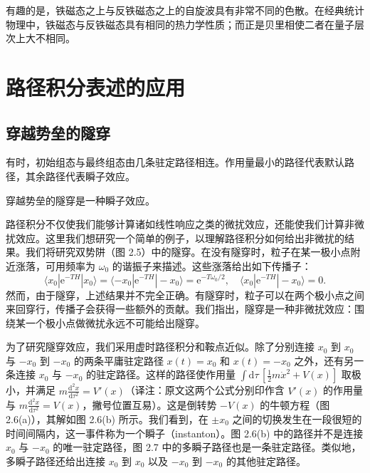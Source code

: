 有趣的是，铁磁态之上与反铁磁态之上的自旋波具有非常不同的色散。在经典统计物理中，铁磁态与反铁磁态具有相同的热力学性质；而正是贝里相使二者在量子层次上大不相同。

\section{路径积分表述的应用}

\subsection{穿越势垒的隧穿}

\begin{keypoints}
\item 有时，初始组态与最终组态由几条驻定路径相连。作用量最小的路径代表默认路径，其余路径代表瞬子效应。
\item 穿越势垒的隧穿是一种瞬子效应。
\end{keypoints}


路径积分不仅使我们能够计算诸如线性响应之类的微扰效应，还能使我们计算非微扰效应。这里我们想研究一个简单的例子，以理解路径积分如何给出非微扰的结果。我们将研究双势阱（图 2.5）中的隧穿。在没有隧穿时，粒子在某一极小点附近涨落，可用频率为 $\omega_0$ 的谐振子来描述。这些涨落给出如下传播子：
\begin{equation*}
\langle x_0|\mathrm{e}^{-TH}|x_0\rangle = \langle -x_0|\mathrm{e}^{-TH}|-x_0\rangle = \mathrm{e}^{-T\omega_0/2}, \quad \langle x_0|\mathrm{e}^{-TH}|-x_0\rangle = 0.
\end{equation*}
然而，由于隧穿，上述结果并不完全正确。有隧穿时，粒子可以在两个极小点之间来回穿行，传播子会获得一些额外的贡献。我们指出，隧穿是一种非微扰效应：围绕某一个极小点做微扰永远不可能给出隧穿。

为了研究隧穿效应，我们采用虚时路径积分和鞍点近似。除了分别连接 $x_0$ 到 $x_0$ 与 $-x_0$ 到 $-x_0$ 的两条平庸驻定路径 $x(t) = x_0$ 和 $x(t) = -x_0$ 之外，还有另一条连接 $x_0$ 与 $-x_0$ 的驻定路径。这样的路径使作用量 $\int \mathrm{d}\tau\,[\frac{1}{2}m\dot{x}^2 + V(x)]$ 取极小，并满足 $m\frac{\mathrm{d}^2 x}{\mathrm{d}\tau^2} = V'(x)$（译注：原文这两个公式分别印作含 $V'(x)$ 的作用量与 $m\frac{\mathrm{d}^2 x}{\mathrm{d}\tau^2} = V(x)$，撇号位置互易）。这是倒转势 $-V(x)$ 的牛顿方程（图 2.6(a)），其解如图 2.6(b) 所示。我们看到，在 $\pm x_0$ 之间的切换发生在一段很短的时间间隔内，这一事件称为一个瞬子（instanton）。图 2.6(b) 中的路径并不是连接 $x_0$ 与 $-x_0$ 的唯一驻定路径，图 2.7 中的多瞬子路径也是一条驻定路径。类似地，多瞬子路径还给出连接 $x_0$ 到 $x_0$ 以及 $-x_0$ 到 $-x_0$ 的其他驻定路径。

